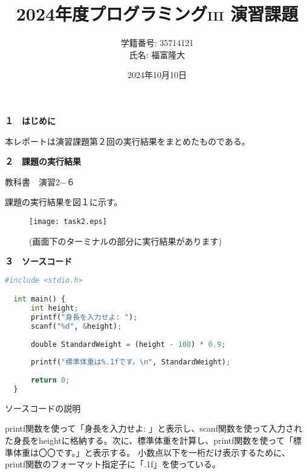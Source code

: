 \documentclass[a4j]{jsarticle}
\title{2024年度プログラミング\textsc{iii} 演習課題}
\author{学籍番号: 35714121 \\ 氏名: 福富隆大}
\date{2024年10月10日}
\begin{document}
\maketitle

\textbf{１　はじめに}

本レポートは演習課題第２回の実行結果をまとめたものである。

\textbf{２　課題の実行結果}

\textmd{教科書　演習2−６}

課題の実行結果を図１に示す。

\begin{figure}[htbp]
  \centering
  \texttt{[image: task2.eps]}
  \caption{(画面下のターミナルの部分に実行結果があります)}
  \label{fig:sample}
\end{figure}

\textbf{３　ソースコード}

\begin{lstlisting}[language=Python, basicstyle=\ttfamily\small, frame=single]
  #include <stdio.h>

  int main() {
      int height;
      printf("身長を入力せよ: ");
      scanf("%d", &height);
  
      double StandardWeight = (height - 100) * 0.9;
  
      printf("標準体重は%.1fです。\n", StandardWeight);
      
      return 0;
  }

\end{lstlisting}

\textmd{ソースコードの説明} 

printf関数を使って「身長を入力せよ: 」と表示し、scanf関数を使って入力された身長をheightに格納する。次に、標準体重を計算し、printf関数を使って「標準体重は〇〇です。」と表示する。
小数点以下を一桁だけ表示するために、printf関数のフォーマット指定子に「.1f」を使っている。
\end{document}
